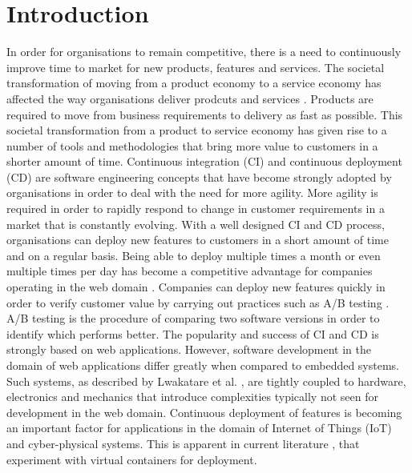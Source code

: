 \iffalse  \fi
%
\chapter{Introduction}
In order for organisations to remain competitive, there is a need to continuously improve time to market for new products, features and services. The societal transformation of moving from a product economy to a service economy has affected the way organisations deliver prodcuts and services \cite{mckinsey}. Products are required to move from business requirements to delivery as fast as possible. This societal transformation from a product to service economy has given rise to a number of tools and methodologies that bring more value to customers in a shorter amount of time. Continuous integration (CI) and continuous deployment (CD) are software engineering concepts that have become strongly adopted by organisations in order to deal with the need for more agility. More agility is required in order to rapidly respond to change in customer requirements in a market that is constantly evolving. With a well designed CI and CD process, organisations can deploy new features to customers in a short amount of time and on a regular basis. Being able to deploy multiple times a month or even multiple times per day has become a competitive advantage for companies operating in the web domain \cite{facebook}. Companies can deploy new features quickly in order to verify customer value by carrying out practices such as A/B testing \cite{abtest}. A/B testing is the procedure of comparing two software versions in order to identify which performs better. The popularity and success of CI and CD is strongly based on web applications. However, software development in the domain of web applications differ greatly when compared to embedded systems. Such systems, as described by Lwakatare et al. \cite{7427859}, are tightly coupled to hardware, electronics and mechanics that introduce complexities typically not seen for development in the web domain. Continuous deployment of features is becoming an important factor for applications in the domain of Internet of Things (IoT) and cyber-physical systems. This is apparent in current literature \cite{gonz,cberger,2iot}, that experiment with virtual containers for deployment. \\

